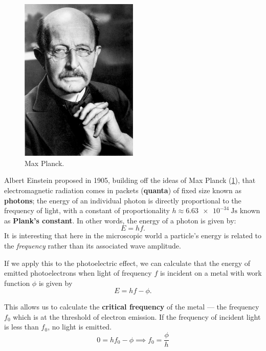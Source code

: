 \documentclass[a4paper]{amsbook}
\theoremstyle{definition}
\numberwithin{exercise}{chapter}
\numberwithin{exercise}{chapter}
\begin{document}
\begin{figure}
  \centering
  \includegraphics[width=0.5\textwidth]{planck}
  \caption{Max Planck. \label{fig:planck}}
\end{figure}
Albert Einstein proposed in 1905, building off the ideas of Max Planck (\cref{fig:planck}), that electromagnetic radiation comes in packets (\textbf{quanta}) of
fixed size known as \textbf{photons}; the energy of an individual photon is directly proportional to the frequency of light, with a constant
of proportionality $ h \approx \SI{6.63e-34}{\joule\second} $ known as \textbf{Plank's constant}. In other words, the energy of a photon is given by:
\begin{equation}
  E = hf.
\end{equation}
It is interesting that here in the microscopic world a particle's energy is related to the \emph{frequency} rather than its associated wave amplitude.

If we apply this to the photoelectric effect, we can calculate that the energy of emitted photoelectrons
when light of frequency $ f $ is incident on a metal with work function $ \phi $ is given by
\begin{equation}
  E = hf - \phi.
\end{equation}

This allows us to calculate the \textbf{critical frequency} of the metal --- the frequency $ f_0 $ which
is at the threshold of electron emission. If the frequency of incident light is less than $ f_0 $, no
light is emitted.
\begin{equation}
  0 = hf_0 - \phi \implies f_0 = \frac{\phi}{h}
\end{equation}
\end{document}
